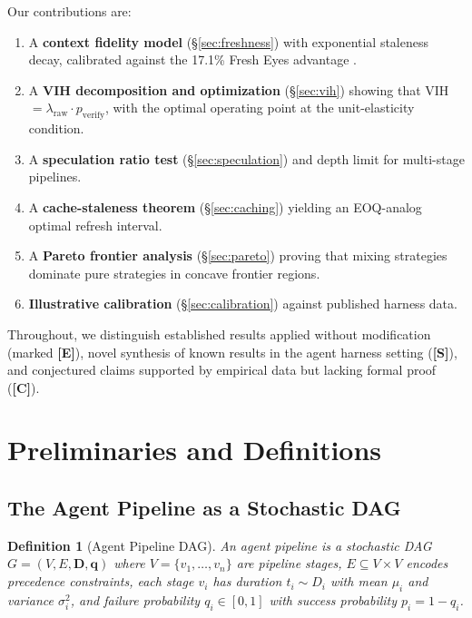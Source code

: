 \documentclass[11pt, a4paper, copyright]{googledeepmind}
\newtheorem{definition}{Definition}[section]
\begin{document}
\noindent Our contributions are:

\begin{enumerate}
    \item A \textbf{context fidelity model} (\S\ref{sec:freshness}) with exponential staleness decay, calibrated against the 17.1\% Fresh Eyes advantage \citep{suzgun2024metaprompting}.
    \item A \textbf{VIH decomposition and optimization} (\S\ref{sec:vih}) showing that VIH $= \lambda_{\mathrm{raw}} \cdot p_{\mathrm{verify}}$, with the optimal operating point at the unit-elasticity condition.
    \item A \textbf{speculation ratio test} (\S\ref{sec:speculation}) and depth limit for multi-stage pipelines.
    \item A \textbf{cache-staleness theorem} (\S\ref{sec:caching}) yielding an EOQ-analog optimal refresh interval.
    \item A \textbf{Pareto frontier analysis} (\S\ref{sec:pareto}) proving that mixing strategies dominate pure strategies in concave frontier regions.
    \item \textbf{Illustrative calibration} (\S\ref{sec:calibration}) against published harness data.
\end{enumerate}

Throughout, we distinguish established results applied without modification (marked \textbf{[E]}), novel synthesis of known results in the agent harness setting (\textbf{[S]}), and conjectured claims supported by empirical data but lacking formal proof (\textbf{[C]}).


\section{Preliminaries and Definitions}\label{sec:prelim}

\subsection{The Agent Pipeline as a Stochastic DAG}

\begin{definition}[Agent Pipeline DAG]\label{def:pipeline}
An agent pipeline is a stochastic DAG $G = (V, E, \mathbf{D}, \mathbf{q})$ where $V = \{v_1, \ldots, v_n\}$ are pipeline stages, $E \subseteq V \times V$ encodes precedence constraints, each stage $v_i$ has duration $t_i \sim D_i$ with mean $\mu_i$ and variance $\sigma_i^2$, and failure probability $q_i \in [0,1]$ with success probability $p_i = 1 - q_i$.
\end{definition}
\end{document}
